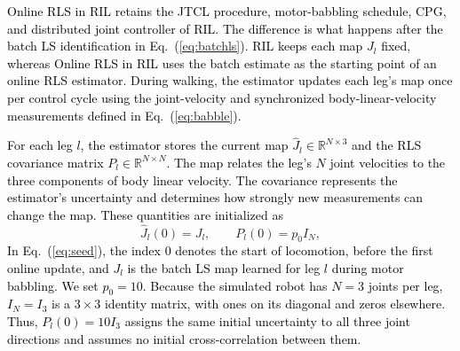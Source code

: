 \documentclass[a4paper, 10pt, conference]{ieeeconf}
\newcommand{\Jm}{J}
\newcommand{\oldtext}[1]{\textcolor{red}{}}
\newcommand{\newtext}[1]{\textcolor{black}{#1}}
\begin{document}

\newtext{Online RLS in RIL retains the JTCL procedure, motor-babbling schedule, CPG, and
distributed joint controller of RIL. The difference is what happens after the
batch LS identification in Eq.~(\ref{eq:batchls}). RIL keeps each map $J_l$
fixed, whereas Online RLS in RIL uses the batch estimate as the starting point of an
online RLS estimator. During walking, the estimator updates each leg's map once
per control cycle using the joint-velocity and synchronized body-linear-velocity
measurements defined in Eq.~(\ref{eq:babble}).}

\newtext{For each leg $l$, the estimator stores the current map
$\hat{\Jm}_l\in\mathbb{R}^{N\times3}$ and the RLS covariance matrix
$P_l\in\mathbb{R}^{N\times N}$. The map relates the leg's $N$ joint velocities
to the three components of body linear velocity. The covariance represents the
estimator's uncertainty and determines how strongly new measurements can change
the map. These quantities are initialized as}
\begin{equation}
  \hat{\Jm}_l(0) = \Jm_l, \qquad P_l(0) = p_0 I_N ,
  \label{eq:seed}
\end{equation}
\newtext{In Eq.~(\ref{eq:seed}), the index $0$ denotes the start of locomotion,
before the first online update, and $\Jm_l$ is the batch LS map learned for leg
$l$ during motor babbling. We set $p_0=10$. Because the simulated robot has
$N=3$ joints per leg, $I_N=I_3$ is a $3\times3$ identity matrix, with ones on
its diagonal and zeros elsewhere. Thus, $P_l(0)=10I_3$ assigns the same initial
uncertainty to all three joint directions and assumes no initial
cross-correlation between them.}
\end{document}
